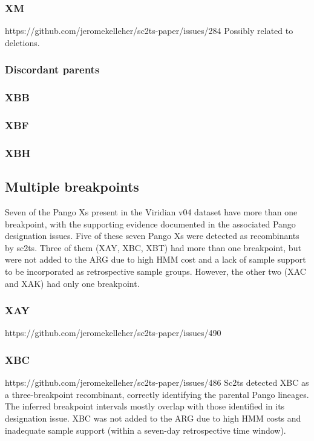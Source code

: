 \documentclass[12pt,letterpaper]{article}
\begin{document}
\subsubsection*{XM}
https://github.com/jeromekelleher/sc2ts-paper/issues/284
Possibly related to deletions.

\subsubsection*{Discordant parents}
\subsubsection*{XBB}

\subsubsection*{XBF}

\subsubsection*{XBH}

\subsection*{Multiple breakpoints}
Seven of the Pango Xs present in the Viridian v04 dataset have more than one breakpoint,
with the supporting evidence documented in the associated Pango designation issues.
Five of these seven Pango Xs were detected as recombinants by sc2ts.
Three of them (XAY, XBC, XBT) had more than one breakpoint,
but were not added to the ARG due to high HMM cost and
a lack of sample support to be incorporated as retrospective sample groups.
However, the other two (XAC and XAK) had only one breakpoint.

\subsubsection*{XAY}
https://github.com/jeromekelleher/sc2ts-paper/issues/490

\subsubsection*{XBC}
https://github.com/jeromekelleher/sc2ts-paper/issues/486
Sc2ts detected XBC as a three-breakpoint recombinant,
correctly identifying the parental Pango lineages.
The inferred breakpoint intervals mostly overlap with those identified in its designation issue.
XBC was not added to the ARG due to high HMM costs and inadequate sample support
(within a seven-day retrospective time window).
\end{document}
